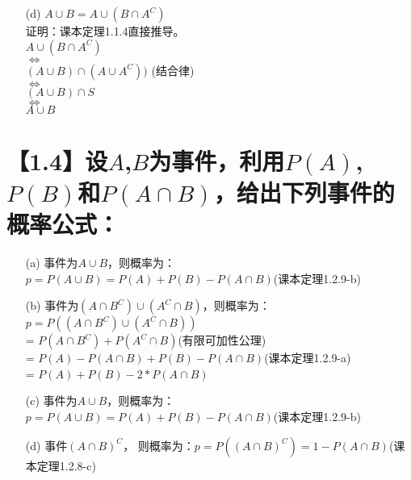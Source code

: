 \documentclass [12pt]{article}
\begin{document}
\begin{CJK*}{GBK}{kai}
\begin{enumerate}
   \item[(d)] $A \cup B = A \cup (B \cap A^{C})$\\
   证明：课本定理1.1.4直接推导。\\
   $ A \cup (B \cap A^{C})$\\
   $\Leftrightarrow$\\
   $(A \cup B) \cap (A \cup A^{C}))$ (结合律)\\
   $\Leftrightarrow$\\
   $(A \cup B) \cap S$\\
   $\Leftrightarrow$\\
   $A \cup B $
\end{enumerate}

\section{【1.4】设$A$,$B$为事件，利用$P(A)$,$P(B)$和$P(A \cap B)$，给出下列事件的概率公式：}
\begin{enumerate}
  \item[(a)]  事件为$A \cup B$，则概率为：$p=P(A \cup B) =  P(A) + P(B) - P(A \cap B) $(课本定理1.2.9-b)
  \item[(b)]  事件为$(A \cap B^{C}) \cup (A^{C} \cap B)$，则概率为：$p=P((A \cap B^{C}) \cup (A^{C} \cap B)) $\\
  = $P(A \cap B^{C}) + P(A^{C} \cap B) $(有限可加性公理)\\
  = $P(A) - P(A \cap B) + P(B) - P(A \cap B)  $(课本定理1.2.9-a)\\
  = $P(A) + P(B) - 2*P(A \cap B) $
  \item[(c)]  事件为$A \cup B$，则概率为：$p=P(A \cup B) =  P(A) + P(B) - P(A \cap B) $(课本定理1.2.9-b)
  \item[(d)]  事件$(A \cap B)^{C}$， 则概率为：$p=P((A \cap B)^{C}) =1 - P(A \cap B)  $(课本定理1.2.8-c)
  
\end{enumerate}
  

\end{CJK*}
\end{document}

